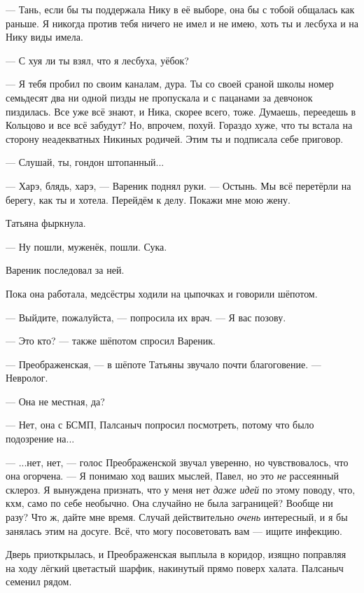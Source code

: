 --- Тань, если бы ты поддержала Нику в её выборе, она бы с тобой общалась как раньше.
Я никогда против тебя ничего не имел и не имею, хоть ты и лесбуха и на Нику виды имела.

--- С хуя ли ты взял, что я лесбуха, уёбок?

--- Я тебя пробил по своим каналам, дура.
Ты со своей сраной школы номер семьдесят два ни одной пизды не пропускала и с пацанами за девчонок пиздилась.
Все уже всё знают, и Ника, скорее всего, тоже.
Думаешь, переедешь в Кольцово и все всё забудут?
Но, впрочем, похуй.
Гораздо хуже, что ты встала на сторону неадекватных Никиных родичей.
Этим ты и подписала себе приговор.

--- Слушай, ты, гондон штопанный...

--- Харэ, блядь, харэ, --- Вареник поднял руки.
--- Остынь.
Мы всё перетёрли на берегу, как ты и хотела.
Перейдём к делу.
Покажи мне мою жену.

Татьяна фыркнула.

--- Ну пошли, муженёк, пошли.
Сука.

Вареник последовал за ней.

\asterism

\textspace

Пока она работала, медсёстры ходили на цыпочках и говорили шёпотом.

--- Выйдите, пожалуйста, --- попросила их врач.
--- Я вас позову.

--- Это кто? --- также шёпотом спросил Вареник.

--- Преображенская, --- в шёпоте Татьяны звучало почти благоговение.
--- Невролог.

--- Она не местная, да?

--- Нет, она с БСМП, Палсаныч попросил посмотреть, потому что было подозрение на...

--- ...нет, нет, --- голос Преображенской звучал уверенно, но чувствовалось, что она огорчена.
--- Я понимаю ход ваших мыслей, Павел, но это \emph{не} рассеянный склероз.
Я вынуждена признать, что у меня нет \emph{даже идей} по этому поводу, что, кхм, само по себе необычно.
Она случайно не была заграницей?
Вообще ни разу?
Что ж, дайте мне время.
Случай действительно \emph{очень} интересный, и я бы занялась этим на досуге.
Всё, что могу посоветовать вам --- ищите инфекцию.

Дверь приоткрылась, и Преображенская выплыла в коридор, изящно поправляя на ходу лёгкий цветастый шарфик, накинутый прямо поверх халата.
Палсаныч семенил рядом.

